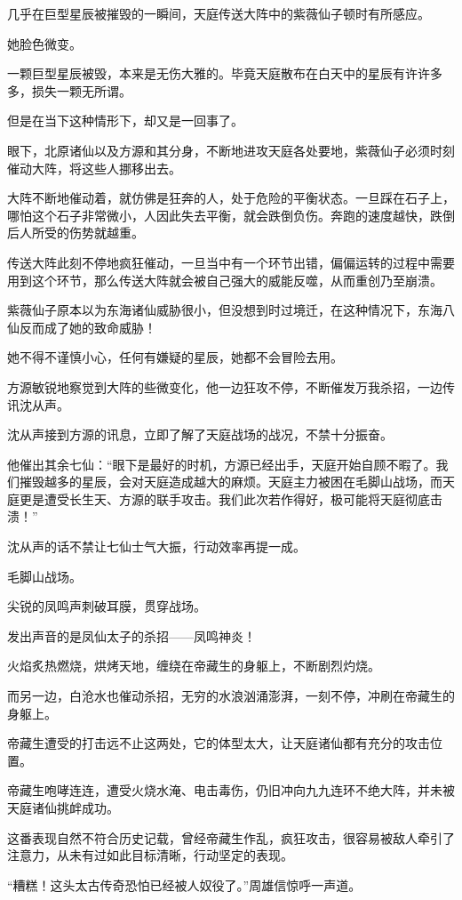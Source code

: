 \begin{this_body}
几乎在巨型星辰被摧毁的一瞬间，天庭传送大阵中的紫薇仙子顿时有所感应。

她脸色微变。

一颗巨型星辰被毁，本来是无伤大雅的。毕竟天庭散布在白天中的星辰有许许多多，损失一颗无所谓。

但是在当下这种情形下，却又是一回事了。

眼下，北原诸仙以及方源和其分身，不断地进攻天庭各处要地，紫薇仙子必须时刻催动大阵，将这些人挪移出去。

大阵不断地催动着，就仿佛是狂奔的人，处于危险的平衡状态。一旦踩在石子上，哪怕这个石子非常微小，人因此失去平衡，就会跌倒负伤。奔跑的速度越快，跌倒后人所受的伤势就越重。

传送大阵此刻不停地疯狂催动，一旦当中有一个环节出错，偏偏运转的过程中需要用到这个环节，那么传送大阵就会被自己强大的威能反噬，从而重创乃至崩溃。

紫薇仙子原本以为东海诸仙威胁很小，但没想到时过境迁，在这种情况下，东海八仙反而成了她的致命威胁！

她不得不谨慎小心，任何有嫌疑的星辰，她都不会冒险去用。

方源敏锐地察觉到大阵的些微变化，他一边狂攻不停，不断催发万我杀招，一边传讯沈从声。

沈从声接到方源的讯息，立即了解了天庭战场的战况，不禁十分振奋。

他催出其余七仙：“眼下是最好的时机，方源已经出手，天庭开始自顾不暇了。我们摧毁越多的星辰，会对天庭造成越大的麻烦。天庭主力被困在毛脚山战场，而天庭更是遭受长生天、方源的联手攻击。我们此次若作得好，极可能将天庭彻底击溃！”

沈从声的话不禁让七仙士气大振，行动效率再提一成。

毛脚山战场。

尖锐的凤鸣声刺破耳膜，贯穿战场。

发出声音的是凤仙太子的杀招——凤鸣神炎！

火焰炙热燃烧，烘烤天地，缠绕在帝藏生的身躯上，不断剧烈灼烧。

而另一边，白沧水也催动杀招，无穷的水浪汹涌澎湃，一刻不停，冲刷在帝藏生的身躯上。

帝藏生遭受的打击远不止这两处，它的体型太大，让天庭诸仙都有充分的攻击位置。

帝藏生咆哮连连，遭受火烧水淹、电击毒伤，仍旧冲向九九连环不绝大阵，并未被天庭诸仙挑衅成功。

这番表现自然不符合历史记载，曾经帝藏生作乱，疯狂攻击，很容易被敌人牵引了注意力，从未有过如此目标清晰，行动坚定的表现。

“糟糕！这头太古传奇恐怕已经被人奴役了。”周雄信惊呼一声道。


\end{this_body}
